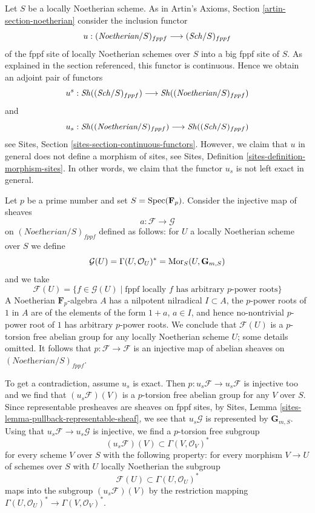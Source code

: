 \noindent
Let $S$ be a locally Noetherian scheme. As in
Artin's Axioms, Section \ref{artin-section-noetherian}
consider the inclusion functor
$$
u : (\textit{Noetherian}/S)_{fppf} \longrightarrow (\mathit{Sch}/S)_{fppf}
$$
of the fppf site of locally Noetherian schemes over $S$ into a
big fppf site of $S$. As explained in the section referenced,
this functor is continuous. Hence we obtain an adjoint pair of functors
$$
u^s :
\mathop{\mathit{Sh}}\nolimits((\mathit{Sch}/S)_{fppf})
\longrightarrow
\mathop{\mathit{Sh}}\nolimits((\textit{Noetherian}/S)_{fppf})
$$
and
$$
u_s :
\mathop{\mathit{Sh}}\nolimits((\textit{Noetherian}/S)_{fppf})
\longrightarrow
\mathop{\mathit{Sh}}\nolimits((\mathit{Sch}/S)_{fppf})
$$
see Sites, Section \ref{sites-section-continuous-functors}.
However, we claim that $u$ in general does not define a
morphism of sites, see Sites, Definition \ref{sites-definition-morphism-sites}.
In other words, we claim that the functor $u_s$ is not left exact in general.

\medskip\noindent
Let $p$ be a prime number and set $S = \mathop{\mathrm{Spec}}(\mathbf{F}_p)$.
Consider the injective map of sheaves
$$
a : \mathcal{F} \longrightarrow \mathcal{G}
$$
on $(\textit{Noetherian}/S)_{fppf}$ defined as follows: for $U$
a locally Noetherian scheme over $S$ we define
$$
\mathcal{G}(U) = \Gamma(U, \mathcal{O}_U)^* =
\mathop{\mathrm{Mor}}\nolimits_S(U, \mathbf{G}_{m, S})
$$
and we take
$$
\mathcal{F}(U) = \{f \in \mathcal{G}(U) \mid \text{fppf locally }f
\text{ has arbitrary }p\text{-power roots}\}
$$
A Noetherian $\mathbf{F}_p$-algebra $A$ has a nilpotent nilradical
$I \subset A$, the $p$-power roots of $1$ in $A$ are of the
elements of the form $1 + a$, $a \in I$, and hence no-nontrivial
$p$-power root of $1$ has arbitrary $p$-power roots. We conclude
that $\mathcal{F}(U)$ is a $p$-torsion free abelian group for any
locally Noetherian scheme $U$; some details omitted. It follows that
$p : \mathcal{F} \to \mathcal{F}$
is an injective map of abelian sheaves on $(\textit{Noetherian}/S)_{fppf}$.

\medskip\noindent
To get a contradiction, assume $u_s$ is exact. Then
$p : u_s\mathcal{F} \to u_s\mathcal{F}$ is injective too
and we find that $(u_s\mathcal{F})(V)$ is a $p$-torsion
free abelian group for any $V$ over $S$. Since
representable presheaves are sheaves on fppf sites, by
Sites, Lemma \ref{sites-lemma-pullback-representable-sheaf},
we see that $u_s\mathcal{G}$ is represented by
$\mathbf{G}_{m, S}$. Using that $u_s\mathcal{F} \to u_s\mathcal{G}$
is injective, we find a $p$-torsion free subgroup
$$
(u_s\mathcal{F})(V) \subset \Gamma(V, \mathcal{O}_V)^*
$$
for every scheme $V$ over $S$ with the following property:
for every morphism $V \to U$ of schemes over $S$ with $U$
locally Noetherian the subgroup
$$
\mathcal{F}(U) \subset \Gamma(U, \mathcal{O}_U)^*
$$
maps into the subgroup $(u_s\mathcal{F})(V)$ by the restriction
mapping $\Gamma(U, \mathcal{O}_U)^* \to \Gamma(V, \mathcal{O}_V)^*$.

